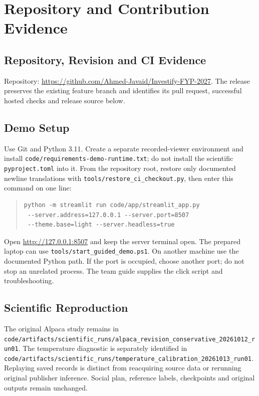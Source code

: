 \chapter{Repository and Contribution Evidence}
\label{app:repository}
\section{Repository, Revision and CI Evidence}
Repository: \url{https://github.com/Ahmed-Javaid/Investify-FYP-2027}. The release preserves the existing feature branch and identifies its pull request, successful hosted checks and release source below.

\section{Demo Setup}
Use Git and Python 3.11. Create a separate recorded-viewer environment and install \nolinkurl{code/requirements-demo-runtime.txt}; do not install the scientific \nolinkurl{pyproject.toml} into it. From the repository root, restore only documented newline translations with \nolinkurl{tools/restore_ci_checkout.py}, then enter this command on one line:
\begin{quote}\small\begin{verbatim}
python -m streamlit run code/app/streamlit_app.py
 --server.address=127.0.0.1 --server.port=8507
 --theme.base=light --server.headless=true
\end{verbatim}\end{quote}
Open \url{http://127.0.0.1:8507} and keep the server terminal open. The prepared laptop can use \nolinkurl{tools/start_guided_demo.ps1}. On another machine use the documented Python path. If the port is occupied, choose another port; do not stop an unrelated process. The team guide supplies the click script and troubleshooting.
\section{Scientific Reproduction}
The original Alpaca study remains in \nolinkurl{code/artifacts/scientific_runs/alpaca_revision_conservative_20261012_run01}. The temperature diagnostic is separately identified in \nolinkurl{code/artifacts/scientific_runs/temperature_calibration_20261013_run01}. Replaying saved records is distinct from reacquiring source data or rerunning original publisher inference. Social plan, reference labels, checkpoints and original outputs remain unchanged.
